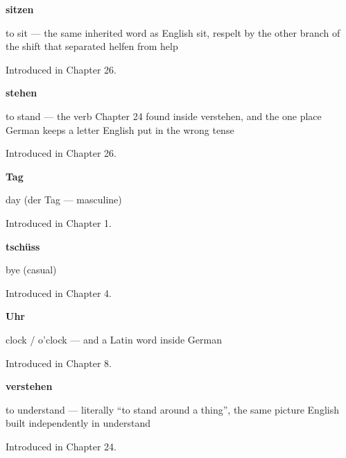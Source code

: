 \noindent\begin{minipage}[t]{\linewidth}
\raggedright
\textbf{sitzen}\par
\small to sit — the same inherited word as English sit, respelt by the other branch of the shift that separated helfen from help\par
\footnotesize Introduced in Chapter 26.
\end{minipage}\par\medskip

\noindent\begin{minipage}[t]{\linewidth}
\raggedright
\textbf{stehen}\par
\small to stand — the verb Chapter 24 found inside verstehen, and the one place German keeps a letter English put in the wrong tense\par
\footnotesize Introduced in Chapter 26.
\end{minipage}\par\medskip

\noindent\begin{minipage}[t]{\linewidth}
\raggedright
\textbf{Tag}\par
\small day (der Tag — masculine)\par
\footnotesize Introduced in Chapter 1.
\end{minipage}\par\medskip

\noindent\begin{minipage}[t]{\linewidth}
\raggedright
\textbf{tschüss}\par
\small bye (casual)\par
\footnotesize Introduced in Chapter 4.
\end{minipage}\par\medskip

\noindent\begin{minipage}[t]{\linewidth}
\raggedright
\textbf{Uhr}\par
\small clock / o'clock — and a Latin word inside German\par
\footnotesize Introduced in Chapter 8.
\end{minipage}\par\medskip

\noindent\begin{minipage}[t]{\linewidth}
\raggedright
\textbf{verstehen}\par
\small to understand — literally \textquotedblleft{}to stand around a thing\textquotedblright{}, the same picture English built independently in understand\par
\footnotesize Introduced in Chapter 24.
\end{minipage}\par\medskip

